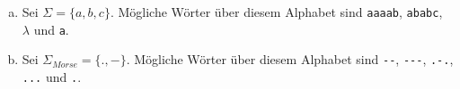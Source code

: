 %
%
\begin{enumerate}[(a)]
    \item Sei \(\Sigma = \{a, b, c\}\). Mögliche Wörter über diesem Alphabet sind \texttt{aaaab}, \texttt{ababc}, \(\lambda\) und \texttt{a}.
    \item Sei \(\Sigma_{Morse} = \{.,-\}\). Mögliche Wörter über diesem Alphabet sind \verb|--|, \verb|---|, \verb|.-.|, \verb|...| und \verb|.|.
\end{enumerate}
